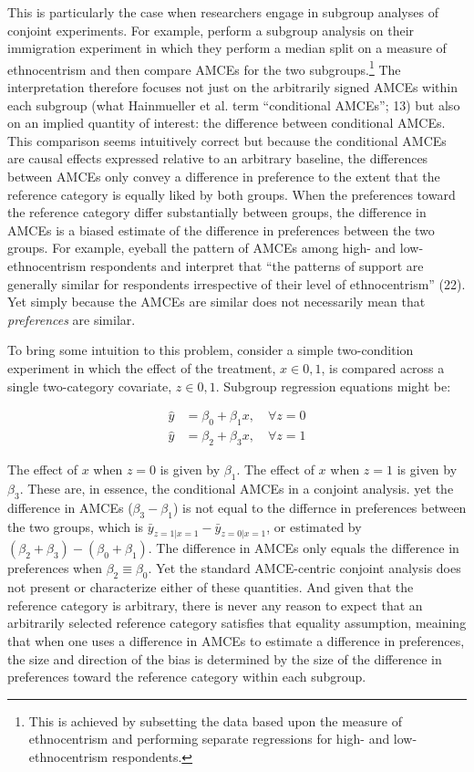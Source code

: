 \documentclass[a4paper,12pt]{article}\usepackage[]{graphicx}\usepackage[]{color}
\begin{document}
This is particularly the case when researchers engage in subgroup analyses of conjoint experiments. For example, \citet{HainmuellerHopkinsYamamoto2014} perform a subgroup analysis on their immigration experiment in which they perform a median split on a measure of ethnocentrism and then compare AMCEs for the two subgroups.\footnote{This is achieved by subsetting the data based upon the measure of ethnocentrism and performing separate regressions for high- and low-ethnocentrism respondents.} The interpretation therefore focuses not just on the arbitrarily signed AMCEs within each subgroup (what Hainmueller et al. term ``conditional AMCEs''; 13) but also on an implied quantity of interest: the difference between conditional AMCEs. This comparison seems intuitively correct but because the conditional AMCEs are causal effects expressed relative to an arbitrary baseline, the differences between AMCEs only convey a difference in preference to the extent that the reference category is equally liked by both groups. When the preferences toward the reference category differ substantially between groups, the difference in AMCEs is a biased estimate of the difference in preferences between the two groups. For example, \citet{HainmuellerHopkinsYamamoto2014} eyeball the pattern of AMCEs among high- and low-ethnocentrism respondents and interpret that ``the patterns of support are generally similar for respondents irrespective of their level of ethnocentrism'' (22). Yet simply because the AMCEs are similar does not necessarily mean that \textit{preferences} are similar.

To bring some intuition to this problem, consider a simple two-condition experiment in which the effect of the treatment, $x \in {0,1}$, is compared across a single two-category covariate, $z \in {0,1}$. Subgroup regression equations might be:

\begin{align*}
\hat{y} &= \beta_0 + \beta_1 x, \quad \forall z = 0 \\
\hat{y} &= \beta_2 + \beta_3 x, \quad \forall z = 1
\end{align*}

\noindent The effect of $x$ when $z=0$ is given by $\beta_1$. The effect of $x$ when $z=1$ is given by $\beta_3$. These are, in essence, the conditional AMCEs in a conjoint analysis. yet the difference in AMCEs ($\beta_3 - \beta_1$) is not equal to the differnce in preferences between the two groups, which is $\bar{y}_{z=1|x=1} - \bar{y}_{z=0|x=1}$, or estimated by $(\beta_2 + \beta_3) - (\beta_0 + \beta_1)$. The difference in AMCEs only equals the difference in preferences when $\beta_2 \equiv \beta_0$. Yet the standard AMCE-centric conjoint analysis does not present or characterize either of these quantities. And given that the reference category is arbitrary, there is never any reason to expect that an arbitrarily selected reference category satisfies that equality assumption, meaining that when one uses a difference in AMCEs to estimate a difference in preferences, the size and direction of the bias is determined by the size of the difference in preferences toward the reference category within each subgroup.
\end{document}
